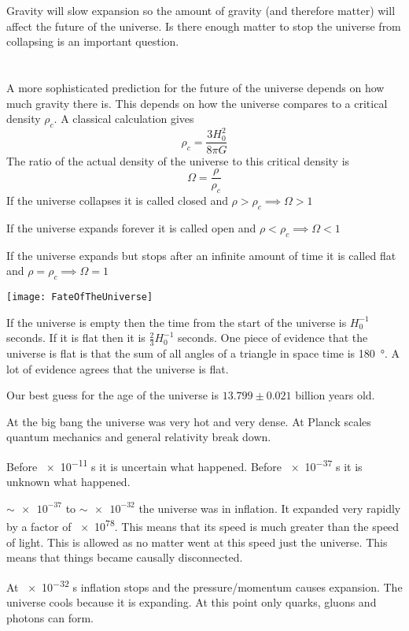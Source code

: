 Gravity will slow expansion so the amount of gravity (and therefore matter) will affect the future of the universe. Is there enough matter to stop the universe from collapsing is an important question.

\section{}

A more sophisticated prediction for the future of the universe depends on how much gravity there is. This depends on how the universe compares to a critical density \(\rho_c\). A classical calculation gives
\[\rho_c=\frac{3H_0^2}{8\pi G}\]
The ratio of the actual density of the universe to this critical density is
\[\Omega=\frac{\rho}{\rho_c}\]
If the universe collapses it is called closed and \(\rho>\rho_c\implies\Omega>1\)

If the universe expands forever it is called open and \(\rho<\rho_c\implies\Omega<1\)

If the universe expands but stops after an infinite amount of time it is called flat and \(\rho=\rho_c\implies\Omega=1\)

\begin{center}
\texttt{[image: FateOfTheUniverse]}
\end{center}

If the universe is empty then the time from the start of the universe is \(H_0^{-1}\) seconds. If it is flat then it is \(\frac 23 H_0^{-1}\) seconds. One piece of evidence that the universe is flat is that the sum of all angles of a triangle in space time is \SI{180}{\degree}. A lot of evidence agrees that the universe is flat.

Our best guess for the age of the universe is \(13.799\pm0.021\) billion years old.

At the big bang the universe was very hot and very dense. At Planck scales quantum mechanics and general relativity break down. 

Before \num{e-11} \si{s} it is uncertain what happened. Before \num{e-37} \si{s} it is unknown what happened.

\(\sim\num{e-37}\) to \(\sim\num{e-32}\) the universe was in inflation. It expanded very rapidly by a factor of \num{e78}. This means that its speed is much greater than the speed of light. This is allowed as no matter went at this speed just the universe. This means that things became causally disconnected.

At \num{e-32} \si{s} inflation stops and the pressure/momentum causes expansion. The universe cools because it is expanding. At this point only quarks, gluons and photons can form.

